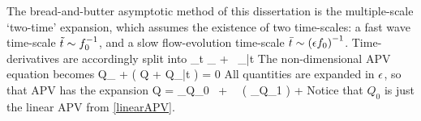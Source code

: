 \documentclass[12pt, oneside]{book}
\begin{document}
The bread-and-butter asymptotic method of this dissertation is the multiple-scale `two-time' expansion, which assumes the existence of two time-scales: a fast wave time-scale $\tt \sim f_0^{-1}$, and a slow flow-evolution time-scale $\bar t \sim \left ( \ep f_0 \right )^{-1}$.  Time-derivatives are accordingly split into
\beq
\p_t \mapsto \p_{\tt} + \ep \, \p_{\bar t} \com
\eeq
The non-dimensional APV equation becomes
\beq
Q_{\tt} + \ep \left ( \bu \bcdot \bnabla Q + Q_{\bar t} \right ) = 0 \per
\label{ndAPVIntro}
\eeq
All quantities are expanded in $\ep$, so that APV has the expansion
\beq
Q = _{ Q_0} \, + \, \ep \, \Big ( _{ Q_1} \Big ) + \cdots 
\eeq
Notice that $Q_0$ is just the linear APV from \eqref{linearAPV}.  
\end{document}
